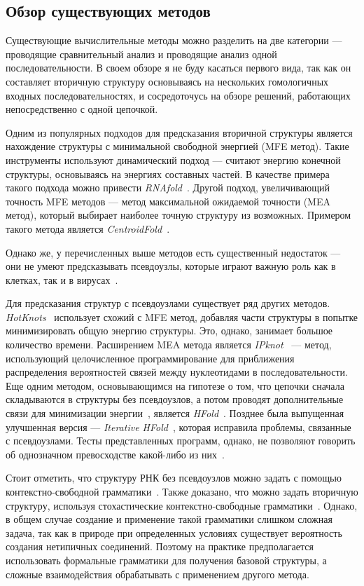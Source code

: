 \documentclass[14pt]{matmex-diploma-custom}
\begin{document}
\subsection{Обзор существующих методов}\label{obzor}
Существующие вычислительные методы можно разделить на две категории --- проводящие сравнительный анализ и проводящие анализ одной последовательности. В своем обзоре я не буду касаться первого вида, так как он составляет вторичную структуру основываясь на нескольких гомологичных входных последовательностях, и сосредоточусь на обзоре решений, работающих непосредственно с одной цепочкой.  \par 
Одним из популярных подходов для предсказания вторичной структуры является нахождение структуры с минимальной свободной энергией (MFE метод). Такие инструменты используют динамический подход --- считают энергию конечной структуры, основываясь на энергиях составных частей. В качестве примера такого подхода можно привести {\it RNAfold}~\cite{Hofacker1994}. Другой подход, увеличивающий точность MFE методов --- метод максимальной ожидаемой точности (MEA метод), который выбирает наиболее точную структуру из возможных. Примером такого метода является {\it CentroidFold}~\cite{hamadaCentroid}. \par
Однако же, у перечисленных выше методов есть существенный недостаток --- они не умеют предсказывать псевдоузлы, которые играют важную роль как в клетках, так и в вирусах~\cite{StaplePseudo, DEIMAN1997166}. \par
Для предсказания структур с псевдоузлами существует ряд других методов. {\it HotKnots}~\cite{Hotknots} использует схожий с MFE метод, добавляя части структуры в попытке минимизировать общую энергию структуры. Это, однако, занимает большое количество времени. Расширением MEA метода является {\it IPknot}~\cite{ipknot} --- метод, использующий целочисленное программирование для приближения распределения вероятностей связей между нуклеотидами в последовательности. Еще одним методом, основывающимся на гипотезе о том, что цепочки сначала складываются в структуры без псевдоузлов, а потом проводят дополнительные связи для минимизации энергии~\cite{TINOCO1999271}, является {\it HFold}~\cite{Hfold}. Позднее была выпущенная улучшенная версия --- {\it Iterative HFold}~\cite{ihfold}, которая исправила проблемы, связанные с псевдоузлами. Тесты представленных программ, однако, не позволяют говорить об однозначном превосходстве какой-либо из них~\cite{comparision}. \par 
Стоит отметить, что структуру РНК без псевдоузлов можно задать с помощью контекстно-свободной грамматики~\cite{rnacf}. Также доказано, что можно задать вторичную структуру, используя стохастические контекстно-свободные грамматики~\cite{Knudsen1999RNASS}. Однако, в общем случае создание и применение такой грамматики слишком сложная задача, так как в природе при определенных условиях существует вероятность создания нетипичных соединений. Поэтому на практике предполагается использовать формальные грамматики для получения базовой структуры, а сложные взаимодействия обрабатывать с применением другого метода. \par 
\end{document}
